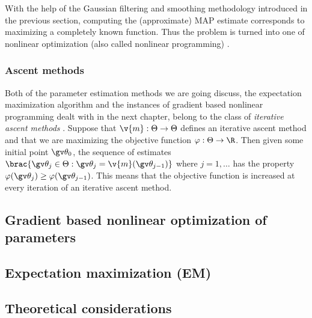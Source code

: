 With the help of the Gaussian filtering and smoothing methodology introduced in the
previous section, computing the (approximate) MAP estimate corresponds to maximizing a
completely known function. Thus the problem is turned into one of nonlinear optimization (also called
nonlinear programming) \parencite{Cappe2005}.

\subsubsection{Ascent methods}

Both of the parameter estimation methods we are going
discuss, the expectation maximization algorithm and
the instances of gradient based nonlinear programming dealt with in the
next chapter, belong to the class of \emph{iterative ascent methods} \parencite{luenberger2008}.
Suppose that $\v{m}:\Theta \to \Theta$ defines an iterative ascent method
and that we are maximizing the objective function $\varphi:\Theta\to\R$.
Then given some initial point $\Th_0$, the sequence of estimates
$\brac{\Th_j \in \Theta: \Th_j=\v{m}(\Th_{j-1})}$ where $j=1,\dots$
has the property $\varphi(\Th_{j})\geq \varphi(\Th_{j-1})$. This means
that the objective function is increased at every iteration of
an iterative ascent method.

\subsection{Gradient based nonlinear optimization of parameters}\label{sec:grad}%


\subsection{Expectation maximization (EM)}%


\subsection{Theoretical considerations}%



